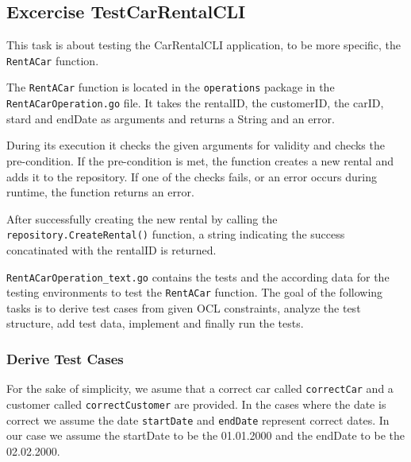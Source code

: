 \subsection{Excercise TestCarRentalCLI}
\label{sec:exercise_test_car_rental_cli}
This task is about testing the CarRentalCLI application, to be more specific, the \texttt{RentACar} function.

The \texttt{RentACar} function is located in the \texttt{operations} package in the \hfill \linebreak \texttt{RentACarOperation.go} file.
It takes the rentalID, the customerID, the carID, stard and endDate as arguments and returns a String and an error.

During its execution it checks the given arguments for validity and checks the pre-condition.
If the pre-condition is met, the function creates a new rental and adds it to the repository.
If one of the checks fails, or an error occurs during runtime, the function returns an error.

After successfully creating the new rental by calling the \texttt{repository.CreateRental()} function, a string indicating the success concatinated with the rentalID is returned.

\texttt{RentACarOperation\_text.go} contains the tests and the according data for the testing environments to test the \texttt{RentACar} function.
The goal of the following tasks is to derive test cases from given OCL constraints, analyze the test structure, add test data, implement and finally run the tests.

\subsubsection*{Derive Test Cases}
For the sake of simplicity, we asume that a correct car called \texttt{correctCar} and a customer called \texttt{correctCustomer} are provided.
In the cases where the date is correct we assume the date \texttt{startDate} and \texttt{endDate} represent correct dates.
In our case we assume the startDate to be the 01.01.2000 and the endDate to be the 02.02.2000.

